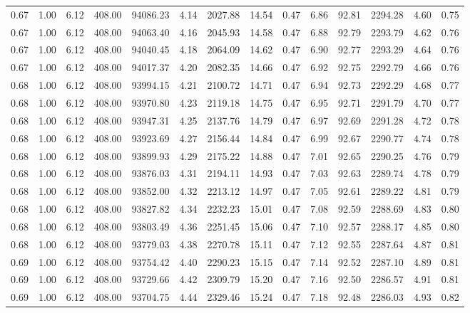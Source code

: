 \begin{table}[!ht]
\begin{tabular}{rrrrrrrrrrrrrr}
0.67 & 1.00 & 6.12 & 408.00 & 94086.23 & 4.14 & 2027.88 & 14.54 & 0.47 & 6.86 & 92.81 & 2294.28 & 4.60 & 0.75 \\
0.67 & 1.00 & 6.12 & 408.00 & 94063.40 & 4.16 & 2045.93 & 14.58 & 0.47 & 6.88 & 92.79 & 2293.79 & 4.62 & 0.76 \\
0.67 & 1.00 & 6.12 & 408.00 & 94040.45 & 4.18 & 2064.09 & 14.62 & 0.47 & 6.90 & 92.77 & 2293.29 & 4.64 & 0.76 \\
0.67 & 1.00 & 6.12 & 408.00 & 94017.37 & 4.20 & 2082.35 & 14.66 & 0.47 & 6.92 & 92.75 & 2292.79 & 4.66 & 0.76 \\
0.68 & 1.00 & 6.12 & 408.00 & 93994.15 & 4.21 & 2100.72 & 14.71 & 0.47 & 6.94 & 92.73 & 2292.29 & 4.68 & 0.77 \\
0.68 & 1.00 & 6.12 & 408.00 & 93970.80 & 4.23 & 2119.18 & 14.75 & 0.47 & 6.95 & 92.71 & 2291.79 & 4.70 & 0.77 \\
0.68 & 1.00 & 6.12 & 408.00 & 93947.31 & 4.25 & 2137.76 & 14.79 & 0.47 & 6.97 & 92.69 & 2291.28 & 4.72 & 0.78 \\
0.68 & 1.00 & 6.12 & 408.00 & 93923.69 & 4.27 & 2156.44 & 14.84 & 0.47 & 6.99 & 92.67 & 2290.77 & 4.74 & 0.78 \\
0.68 & 1.00 & 6.12 & 408.00 & 93899.93 & 4.29 & 2175.22 & 14.88 & 0.47 & 7.01 & 92.65 & 2290.25 & 4.76 & 0.79 \\
0.68 & 1.00 & 6.12 & 408.00 & 93876.03 & 4.31 & 2194.11 & 14.93 & 0.47 & 7.03 & 92.63 & 2289.74 & 4.78 & 0.79 \\
0.68 & 1.00 & 6.12 & 408.00 & 93852.00 & 4.32 & 2213.12 & 14.97 & 0.47 & 7.05 & 92.61 & 2289.22 & 4.81 & 0.79 \\
0.68 & 1.00 & 6.12 & 408.00 & 93827.82 & 4.34 & 2232.23 & 15.01 & 0.47 & 7.08 & 92.59 & 2288.69 & 4.83 & 0.80 \\
0.68 & 1.00 & 6.12 & 408.00 & 93803.49 & 4.36 & 2251.45 & 15.06 & 0.47 & 7.10 & 92.57 & 2288.17 & 4.85 & 0.80 \\
0.68 & 1.00 & 6.12 & 408.00 & 93779.03 & 4.38 & 2270.78 & 15.11 & 0.47 & 7.12 & 92.55 & 2287.64 & 4.87 & 0.81 \\
0.69 & 1.00 & 6.12 & 408.00 & 93754.42 & 4.40 & 2290.23 & 15.15 & 0.47 & 7.14 & 92.52 & 2287.10 & 4.89 & 0.81 \\
0.69 & 1.00 & 6.12 & 408.00 & 93729.66 & 4.42 & 2309.79 & 15.20 & 0.47 & 7.16 & 92.50 & 2286.57 & 4.91 & 0.81 \\
0.69 & 1.00 & 6.12 & 408.00 & 93704.75 & 4.44 & 2329.46 & 15.24 & 0.47 & 7.18 & 92.48 & 2286.03 & 4.93 & 0.82 \\

\end{tabular}
\end{table}
